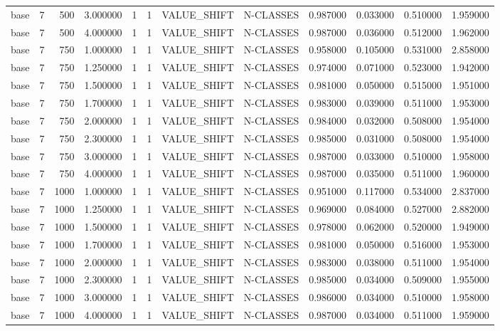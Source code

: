 \begin{tabular}{lrrrllllrrrr}
base & 7 & 500 & 3.000000 & 1 & 1 & VALUE_SHIFT & N-CLASSES & 0.987000 & 0.033000 & 0.510000 & 1.959000 \\
base & 7 & 500 & 4.000000 & 1 & 1 & VALUE_SHIFT & N-CLASSES & 0.987000 & 0.036000 & 0.512000 & 1.962000 \\
base & 7 & 750 & 1.000000 & 1 & 1 & VALUE_SHIFT & N-CLASSES & 0.958000 & 0.105000 & 0.531000 & 2.858000 \\
base & 7 & 750 & 1.250000 & 1 & 1 & VALUE_SHIFT & N-CLASSES & 0.974000 & 0.071000 & 0.523000 & 1.942000 \\
base & 7 & 750 & 1.500000 & 1 & 1 & VALUE_SHIFT & N-CLASSES & 0.981000 & 0.050000 & 0.515000 & 1.951000 \\
base & 7 & 750 & 1.700000 & 1 & 1 & VALUE_SHIFT & N-CLASSES & 0.983000 & 0.039000 & 0.511000 & 1.953000 \\
base & 7 & 750 & 2.000000 & 1 & 1 & VALUE_SHIFT & N-CLASSES & 0.984000 & 0.032000 & 0.508000 & 1.954000 \\
base & 7 & 750 & 2.300000 & 1 & 1 & VALUE_SHIFT & N-CLASSES & 0.985000 & 0.031000 & 0.508000 & 1.954000 \\
base & 7 & 750 & 3.000000 & 1 & 1 & VALUE_SHIFT & N-CLASSES & 0.987000 & 0.033000 & 0.510000 & 1.958000 \\
base & 7 & 750 & 4.000000 & 1 & 1 & VALUE_SHIFT & N-CLASSES & 0.987000 & 0.035000 & 0.511000 & 1.960000 \\
base & 7 & 1000 & 1.000000 & 1 & 1 & VALUE_SHIFT & N-CLASSES & 0.951000 & 0.117000 & 0.534000 & 2.837000 \\
base & 7 & 1000 & 1.250000 & 1 & 1 & VALUE_SHIFT & N-CLASSES & 0.969000 & 0.084000 & 0.527000 & 2.882000 \\
base & 7 & 1000 & 1.500000 & 1 & 1 & VALUE_SHIFT & N-CLASSES & 0.978000 & 0.062000 & 0.520000 & 1.949000 \\
base & 7 & 1000 & 1.700000 & 1 & 1 & VALUE_SHIFT & N-CLASSES & 0.981000 & 0.050000 & 0.516000 & 1.953000 \\
base & 7 & 1000 & 2.000000 & 1 & 1 & VALUE_SHIFT & N-CLASSES & 0.983000 & 0.038000 & 0.511000 & 1.954000 \\
base & 7 & 1000 & 2.300000 & 1 & 1 & VALUE_SHIFT & N-CLASSES & 0.985000 & 0.034000 & 0.509000 & 1.955000 \\
base & 7 & 1000 & 3.000000 & 1 & 1 & VALUE_SHIFT & N-CLASSES & 0.986000 & 0.034000 & 0.510000 & 1.958000 \\
base & 7 & 1000 & 4.000000 & 1 & 1 & VALUE_SHIFT & N-CLASSES & 0.987000 & 0.034000 & 0.511000 & 1.959000 \\

\end{tabular}
